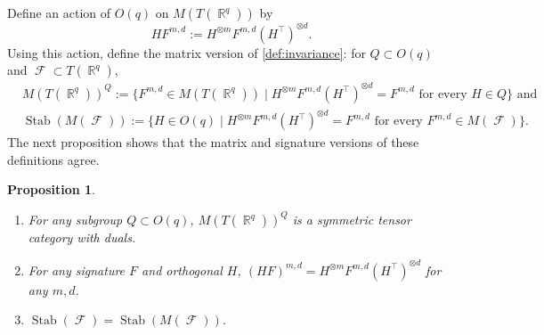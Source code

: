 \documentclass{article}
\newtheorem{proposition}{Proposition}[section]
\theoremstyle{remark}
\theoremstyle{definition}
\DeclareMathOperator{\rr}{\mathbb{R}}
\DeclareMathOperator{\fc}{\mathcal{F}}
\DeclareMathOperator{\stab}{Stab}
\begin{document}
Define an action of $O(q)$ on $M(T(\rr^q))$ by 
\[
    HF^{m,d} := H^{\otimes m} F^{m,d} (H^\top)^{\otimes d}.
\]
Using this action, define the matrix version of \autoref{def:invariance}: for $Q \subset O(q)$ and
$\fc \subset T(\rr^q)$,
\begin{align*}
    &M(T(\rr^q))^Q := \{F^{m,d} \in M(T(\rr^q)) \mid H^{\otimes m} F^{m,d} (H^\top)^{\otimes d} = F^{m,d} \text{ for every } H \in Q\} \text{ and}\\
    &\stab(M(\fc)) := \{H \in O(q) \mid H^{\otimes m}F^{m,d} (H^\top)^{\otimes d} = F^{m,d} \text{ for every } F^{m,d} \in M(\fc)\}. 
\end{align*}
The next proposition shows that the matrix and signature versions of these definitions agree.
\begin{proposition}
    \label{prop:invariant_tcwd}
    ~
    \begin{enumerate}
        \item For any subgroup $Q \subset O(q)$, $M(T(\rr^q))^Q$ is a symmetric tensor category with duals.
        \item For any signature $F$ and orthogonal $H$,
            $(HF)^{m,d} = H^{\otimes m} F^{m,d} (H^\top)^{\otimes d}$ for any $m,d$.
        \item $\stab(\fc) = \stab(M(\fc))$. 
    \end{enumerate}
\end{proposition}
\end{document}
